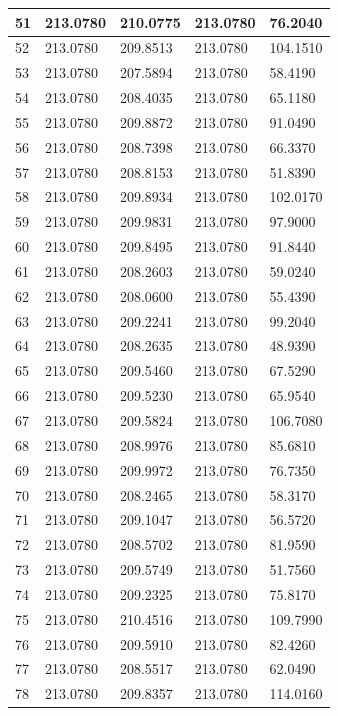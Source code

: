 \begin{longtable}{|l|l|l|l|l|}
51 & 213.0780 & 210.0775 & 213.0780 & 76.2040 \\\hline
52 & 213.0780 & 209.8513 & 213.0780 & 104.1510 \\\hline
53 & 213.0780 & 207.5894 & 213.0780 & 58.4190 \\\hline
54 & 213.0780 & 208.4035 & 213.0780 & 65.1180 \\\hline
55 & 213.0780 & 209.8872 & 213.0780 & 91.0490 \\\hline
56 & 213.0780 & 208.7398 & 213.0780 & 66.3370 \\\hline
57 & 213.0780 & 208.8153 & 213.0780 & 51.8390 \\\hline
58 & 213.0780 & 209.8934 & 213.0780 & 102.0170 \\\hline
59 & 213.0780 & 209.9831 & 213.0780 & 97.9000 \\\hline
60 & 213.0780 & 209.8495 & 213.0780 & 91.8440 \\\hline
61 & 213.0780 & 208.2603 & 213.0780 & 59.0240 \\\hline
62 & 213.0780 & 208.0600 & 213.0780 & 55.4390 \\\hline
63 & 213.0780 & 209.2241 & 213.0780 & 99.2040 \\\hline
64 & 213.0780 & 208.2635 & 213.0780 & 48.9390 \\\hline
65 & 213.0780 & 209.5460 & 213.0780 & 67.5290 \\\hline
66 & 213.0780 & 209.5230 & 213.0780 & 65.9540 \\\hline
67 & 213.0780 & 209.5824 & 213.0780 & 106.7080 \\\hline
68 & 213.0780 & 208.9976 & 213.0780 & 85.6810 \\\hline
69 & 213.0780 & 209.9972 & 213.0780 & 76.7350 \\\hline
70 & 213.0780 & 208.2465 & 213.0780 & 58.3170 \\\hline
71 & 213.0780 & 209.1047 & 213.0780 & 56.5720 \\\hline
72 & 213.0780 & 208.5702 & 213.0780 & 81.9590 \\\hline
73 & 213.0780 & 209.5749 & 213.0780 & 51.7560 \\\hline
74 & 213.0780 & 209.2325 & 213.0780 & 75.8170 \\\hline
75 & 213.0780 & 210.4516 & 213.0780 & 109.7990 \\\hline
76 & 213.0780 & 209.5910 & 213.0780 & 82.4260 \\\hline
77 & 213.0780 & 208.5517 & 213.0780 & 62.0490 \\\hline
78 & 213.0780 & 209.8357 & 213.0780 & 114.0160 \\\hline

\end{longtable}
